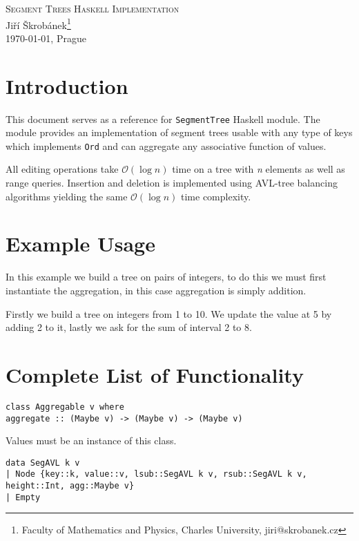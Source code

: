 \documentclass[a4paper,10pt,openany]{article}
\begin{document}
\begin{center}
{\huge \textsc{Segment Trees Haskell Implementation}}\\
\vspace{10mm} {\large Jiří Škrobánek\footnote[1]{Faculty of Mathematics and Physics, Charles University, {\ttfamily jiri@skrobanek.cz}}}\\
\vspace{10mm}\today, Prague

\end{center}

\section*{Introduction}
This document serves as a reference for \texttt{SegmentTree} Haskell module. The module provides an implementation of segment trees usable with any type of keys which implements \texttt{Ord} and can aggregate any associative function of values.

All editing operations take $\mathcal{O}(\log n)$ time on a tree with \textit{n} elements as well as range queries. Insertion and deletion is implemented using AVL-tree balancing algorithms yielding the same $\mathcal{O}(\log n)$ time complexity.

\section*{Example Usage}

In this example we build a tree on pairs of integers, to do this we must first instantiate the aggregation, in this case aggregation is simply addition. 

Firstly we build a tree on integers from 1 to 10. We update the value at 5 by adding 2 to it, lastly we ask for the sum of interval 2 to 8.



\section*{Complete List of Functionality}
\begin{lstlisting}
class Aggregable v where
aggregate :: (Maybe v) -> (Maybe v) -> (Maybe v)
\end{lstlisting}
Values must be an instance of this class.
\begin{lstlisting}
data SegAVL k v
| Node {key::k, value::v, lsub::SegAVL k v, rsub::SegAVL k v, height::Int, agg::Maybe v}
| Empty 
\end{lstlisting}
\end{document}
